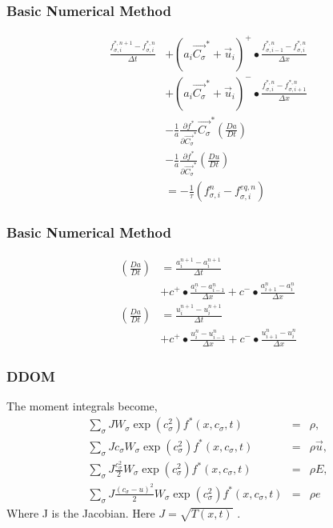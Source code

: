 \begin{frame}
	\frametitle{Basic Numerical Method}
		\begin{equation}
		\begin{split}
			\frac{f^{*,n+1}_{\sigma,i} - f^{*,n}_{\sigma,i}}{\Delta t} & + 
			(a_i\vec{C_\sigma}^{*}+\vec{u}_i)^{+} \bullet \frac{f^{*,n}_{\sigma,i-1} - f^{*,n}_{\sigma,i}}{\Delta x} 
			\\ & +(a_i\vec{C_\sigma}^{*}+\vec{u}_i)^{-} \bullet \frac{f^{*,n}_{\sigma,i} - f^{*,n}_{\sigma,i+1}}{\Delta x}
			\\ & -\frac{1}{a}\frac{\partial f^*}{\partial \vec{C_\sigma}^*}\vec{C_\sigma}^*\left(\frac{D a}{D t} \right )
			\\ & -\frac{1}{a}\frac{\partial f^*}{\partial \vec{C_\sigma}^*}\left(\frac{D u}{D t} \right)
			\\ & = -\frac{1}{\tau}(f^n_{\sigma,i} - f^{eq,n}_{\sigma,i})
		\end{split}
	\end{equation}
\end{frame}
	
\begin{frame}
	\frametitle{Basic Numerical Method}
		\begin{align*}
			\left(\frac{D a}{D t} \right ) &= \frac{a^{n+1}_{i} - a^{n+1}_{i}}{\Delta t} \\
				& + c^{+} \bullet \frac{a^{n}_{i} - a^{n}_{i-1}}{\Delta x}
				 + c^{-} \bullet \frac{a^{n}_{i+1} - a^{n}_{i}}{\Delta x} \\
			\left(\frac{D a}{D t} \right ) &= \frac{u^{n+1}_{i} - u^{n+1}_{i}}{\Delta t} \\
				& + c^{+} \bullet \frac{u^{n}_{i} - u^{n}_{i-1}}{\Delta x}
				 + c^{-} \bullet \frac{u^{n}_{i+1} - u^{n}_{i}}{\Delta x}
		\end{align*}
\end{frame}

\begin{frame}
	\frametitle{DDOM}
	The moment integrals become,
	\begin{eqnarray}
		\sum_\sigma J W_\sigma \exp(c_\sigma^2) f^*(x,c_\sigma,t) &=&  \rho, \\
		\sum_\sigma J c_\sigma W_\sigma \exp(c_\sigma^2) f^*(x,c_\sigma,t) &=& \rho \vec{u}, \nonumber \\
		\sum_\sigma J \frac{c_\sigma^2}{2} W_\sigma \exp(c_\sigma^2) f^*(x,c_\sigma,t) &=& \rho E, \nonumber \\
		\sum_\sigma J \frac{(c_\sigma-u)^2}{2} W_\sigma \exp(c_\sigma^2) f^*(x,c_\sigma,t) &=& \rho e  \nonumber
	\end{eqnarray}
	Where J is the Jacobian. Here $J = \sqrt{T(x,t)}$ .
\end{frame}

